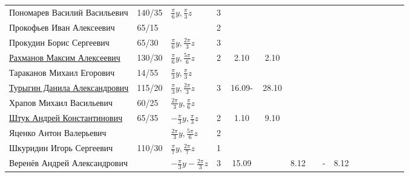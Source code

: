 \documentclass[a4paper,landscape,11pt]{article}
\begin{document}
\begin{tabular}{l|llccccccccccccc}
	Пономарев Василий Васильевич	&140/35&$\frac{\pi}{6}y,\frac{\pi}{3}z$&3&       &\\
	Прокофьев Иван Алексеевич	&65/15 &&2&       &\\	
	Прокудин Борис Сергеевич	&65/30 &$\frac{\pi}{6}y,\frac{2\pi}{3}z$&3&       &\\	
	\href{}{Рахманов Максим Алексеевич}	        &130/30&$\frac{\pi}{6}y,\frac{5\pi}{6}z$&2&2.10&2.10&\\	
Тараканов Михаил Егорович	&14/55&$\frac{\pi}{3}y,\frac{\pi}{3}z$&       &\\	
	\href{}{Турыгин Данила Александрович}	        &115/20&$\frac{\pi}{3}y,\frac{2\pi}{3}z$&3&\,16.09-\,&28.10\\
Храпов Михаил Васильевич	&60/25 &$\frac{2\pi}{3}y,\frac{\pi}{6}z$&       &\\	
\midrule                                    
	\href{}{Штук Андрей Константинович}	                &65/35 &$-\frac{\pi}{3}y,\frac{\pi}{3}z$&2&1.10&9.10\\	
	Яценко Антон Валерьевич		&  &$\frac{2\pi}{3}y,\frac{5\pi}{6}z$&2&       &\\
	Шкуридин Игорь Сергеевич	&110/30&$\frac{\pi}{7}y,\frac{2\pi}{7}z$&1&       &\\	
	Веренёв Андрей Александрович	&  &$-\!\frac{\pi}{3}y\!-\!\frac{2\pi}{3}z\!$&3&\,15.09\,&&8.12&&-&8.12&\\
\bottomrule
\end{tabular}
\end{document}
